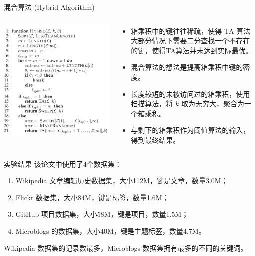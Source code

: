 \documentclass[10pt,aspectratio=169]{beamer}
\begin{document}
\begin{frame}{混合算法 (Hybrid Algorithm)}
    \begin{columns}
        \begin{column}{.3\textwidth}
            \includegraphics[width=\textwidth]{pic/hybrid.png}
        \end{column}
        \begin{column}{.7\textwidth}
            \begin{itemize}[<+->]
                \item 箱乘积中的键往往稀疏，使得 TA 算法大部分情况下需要二分查找一个不存在的键，使得TA算法并未达到实际最优。
                \item 混合算法的想法是提高箱乘积中键的密度。
                \item 长度较短的未被访问过的箱乘积，使用扫描算法，将 $k$ 取为无穷大，聚合为一个箱乘积。
                \item 与剩下的箱乘积作为阈值算法的输入，得到最终结果。
            \end{itemize}
        \end{column}
    \end{columns}
\end{frame}


\begin{frame}{实验结果}
    该论文中使用了4个数据集：
    \begin{enumerate}
        \item Wikipedia 文章编辑历史数据集，大小112M，键是文章，数量3.0M；
        \item Flickr 数据集，大小84M，键是标签，数量1.6M；
        \item GitHub 项目数据集，大小58M，键是项目，数量1.5M；
        \item Microblogs 的数据集，大小40M，键是主题标签，数量4.7M。
    \end{enumerate}
    Wikipedia 数据集的记录数最多，Microblogs 数据集拥有最多的不同的关键词。
\end{frame}
\end{document}
